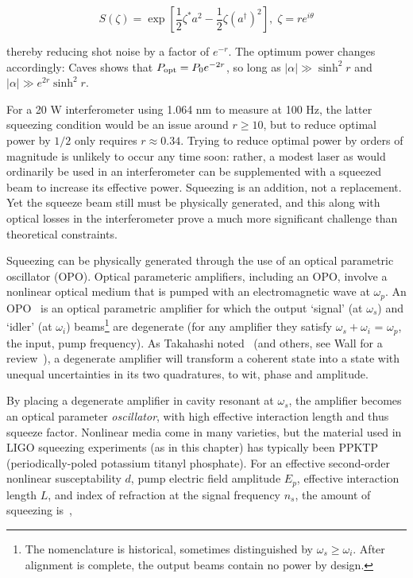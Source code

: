 \begin{equation}
S(\zeta)=\exp[\frac{1}{2}\zeta^{*}a^{2}-\frac{1}{2}\zeta(a^{\dagger})^{2}],\;\zeta=re^{i\theta}
\label{squeeze_operator_caves}
\end{equation}

\noindent thereby reducing shot noise by a factor of $e^{-r}$. The optimum power changes accordingly: Caves shows that $P_\textup{opt} = P_0 e^{-2r}$, so long as $|\alpha|\gg\sinh^2r$ and $|\alpha|\gg e^{2r}\sinh^2 r$. 

For a 20 W interferometer using 1.064 nm to measure at 100 Hz, the latter squeezing condition would be an issue around $r\geq10$, but to reduce optimal power by $1/2$ only requires $r \approx 0.34$. 
Trying to reduce optimal power by orders of magnitude is unlikely to occur any time soon: rather, a modest laser as would ordinarily be used in an interferometer can be supplemented with a squeezed beam to increase its effective power. 
Squeezing is an addition, not a replacement.
Yet the squeeze beam still must be physically generated, and this along with optical losses in the interferometer prove a much more significant challenge than theoretical constraints.

Squeezing can be physically generated through the use of an optical parametric oscillator (OPO).
Optical parameteric amplifiers, including an OPO, involve a nonlinear optical medium that is pumped with an electromagnetic wave at $\omega_p$.
An OPO~\cite{Caves1981} is an optical parametric amplifier for which the output `signal' (at $\omega_s$) and `idler' (at $\omega_i$) beams\footnote{The nomenclature is historical, sometimes distinguished by $\omega_s\geq\omega_i$. After alignment is complete, the output beams contain no power by design.} are degenerate (for any amplifier they satisfy $\omega_s + \omega_i$ = $\omega_p$, the input, pump frequency).
As Takahashi noted~\cite{Takahashi1965} (and others, see Wall for a review~\cite{Walls1983}), a degenerate amplifier will transform a coherent state into a state with unequal uncertainties in its two quadratures, to wit, phase and amplitude.

By placing a degenerate amplifier in cavity resonant at $\omega_s$, the amplifier becomes an optical parameter \textit{oscillator}, with high effective interaction length and thus squeeze factor.
Nonlinear media come in many varieties, but the material used in LIGO squeezing experiments (as in this chapter) has typically been PPKTP (periodically-poled potassium titanyl phosphate).
For an effective second-order nonlinear susceptability $d$, pump electric field amplitude $E_p$, effective interaction length $L$, and index of refraction at the signal frequency $n_s$, the amount of squeezing is~\cite{Caves1981},

